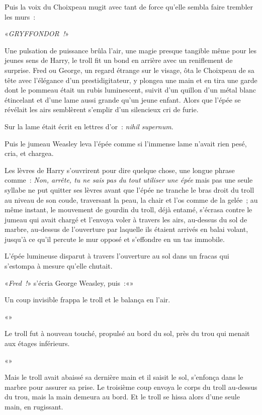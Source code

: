 Puis la voix du Choixpeau mugit avec tant de force qu'elle sembla faire trembler les murs~:

«\emph{GRYFFONDOR~!}»

Une pulsation de puissance brûla l'air, une magie presque tangible même pour les jeunes sens de Harry, le troll fit un bond en arrière avec un reniflement de surprise. Fred ou George, un regard étrange sur le visage, ôta le Choixpeau de sa tête avec l'élégance d'un prestidigitateur, y plongea une main et en tira une garde dont le pommeau était un rubis luminescent, suivit d'un quillon d'un métal blanc étincelant et d'une lame aussi grande qu'un jeune enfant. Alors que l'épée se révélait les airs semblèrent s'emplir d'un silencieux cri de furie.

Sur la lame était écrit en lettres d'or~: \emph{nihil supernum}.

Puis le jumeau Weasley leva l'épée comme si l'immense lame n'avait rien pesé, cria, et chargea.

Les lèvres de Harry s'ouvrirent pour dire quelque chose, une longue phrase comme~: \emph{Non, arrête, tu ne sais pas du tout utiliser une épée} mais pas une seule syllabe ne put quitter ses lèvres avant que l'épée ne tranche le bras droit du troll au niveau de son coude, traversant la peau, la chair et l'os comme de la gelée~; au même instant, le mouvement de gourdin du troll, déjà entamé, s'écrasa contre le jumeau qui avait chargé et l'envoya voler à travers les airs, au-dessus du sol de marbre, au-dessus de l'ouverture par laquelle ils étaient arrivés en balai volant, jusqu'à ce qu'il percute le mur opposé et s'effondre en un tas immobile.

L'épée lumineuse disparut à travers l'ouverture au sol dans un fracas qui s'estompa à mesure qu'elle chutait.

«\emph{Fred~!}» s'écria George Weasley, puis~:«»

Un coup invisible frappa le troll et le balança en l'air.

«»

Le troll fut à nouveau touché, propulsé au bord du sol, près du trou qui menait aux étages inférieurs.

«»

Mais le troll avait abaissé sa dernière main et il saisit le sol, s'enfonça dans le marbre pour assurer sa prise. Le troisième coup envoya le corps du troll au-dessus du trou, mais la main demeura au bord. Et le troll se hissa alors d'une seule main, en rugissant.

